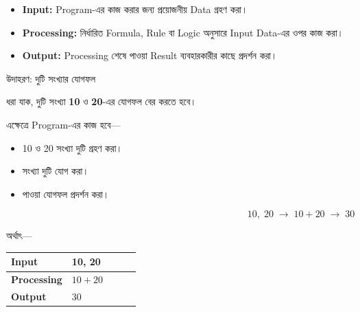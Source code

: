 \begin{itemize}

\item \textbf{Input:} Program-এর কাজ করার জন্য প্রয়োজনীয় Data গ্রহণ করা।

\item \textbf{Processing:} নির্ধারিত Formula, Rule বা Logic অনুসারে
Input Data-এর ওপর কাজ করা।

\item \textbf{Output:} Processing শেষে পাওয়া Result ব্যবহারকারীর
কাছে প্রদর্শন করা।

\end{itemize}

\begin{examplebox}{উদাহরণ: দুটি সংখ্যার যোগফল}

ধরা যাক, দুটি সংখ্যা \textbf{10} ও \textbf{20}-এর যোগফল বের করতে হবে।

এক্ষেত্রে Program-এর কাজ হবে—

\begin{itemize}

\item 10 ও 20 সংখ্যা দুটি গ্রহণ করা।

\item সংখ্যা দুটি যোগ করা।

\item পাওয়া যোগফল প্রদর্শন করা।

\end{itemize}

\[
\boxed{
10,\;20
\;\longrightarrow\;
10+20
\;\longrightarrow\;
30
}
\]

অর্থাৎ—

\begin{center}
\begin{tabularx}{0.78\linewidth}{|>{\bfseries}C{0.22\linewidth}|Y|}
\hline
Input & 10, 20\\
\hline
Processing & \(10+20\)\\
\hline
Output & 30\\
\hline
\end{tabularx}
\end{center}

\end{examplebox}


